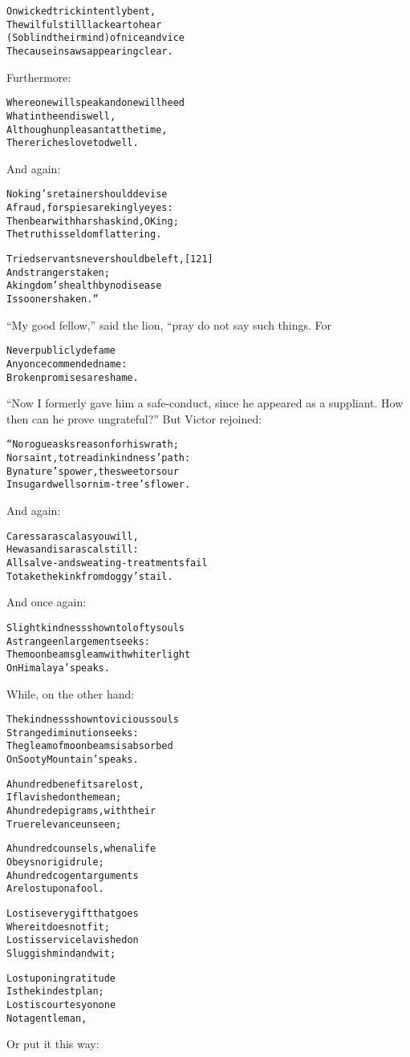 \documentclass{article}
\renewenvironment{verbatim}{\begin{alltt}\normalfont\begin{centering}}{\end{centering}\end{alltt}}
\begin{document}
\begin{verbatim}
On wicked trick intently bent,
    The wilful still lack ear to hear
(So blind their mind) of nice and vice
    The cause in saws appearing clear.
\end{verbatim}
Furthermore:

\begin{verbatim}
Where one will speak and one will heed
    What in the end is well,
Although unpleasant at the time,
    There riches love to dwell.
\end{verbatim}
And again:

\begin{verbatim}
No king's retainer should devise
A fraud, for spies are kingly eyes:
Then bear with harsh as kind, O King;
The truth is seldom flattering.

Tried servants never should be left,                    [121]
    And strangers taken;
A kingdom's health by no disease
    Is sooner shaken.”
\end{verbatim}
``My good fellow,'' said the lion, “pray do not say such things.
For

\begin{verbatim}
Never publicly defame
Any once commended name:
Broken promises are shame.
\end{verbatim}
``Now I formerly gave him a safe-conduct, since he appeared as a suppliant. How then can he prove ungrateful?''
But Victor rejoined:

\begin{verbatim}
“No rogue asks reason for his wrath;
Nor saint, to tread in kindness' path:
By nature's power, the sweet or sour
In sugar dwells or nim-tree's flower.
\end{verbatim}
And again:

\begin{verbatim}
Caress a rascal as you will,
He was and is a rascal still:
All salve- and sweating-treatments fail
To take the kink from doggy's tail.
\end{verbatim}
And once again:

\begin{verbatim}
Slight kindness shown to lofty souls
A strange enlargement seeks:
The moonbeams gleam with whiter light
On Himalaya's peaks.
\end{verbatim}
While, on the other hand:

\begin{verbatim}
The kindness shown to vicious souls
    Strange diminution seeks:
The gleam of moonbeams is absorbed
    On Sooty Mountain's peaks.

A hundred benefits are lost,
    If lavished on the mean;
A hundred epigrams, with their
    True relevance unseen;

A hundred counsels, when a life
    Obeys no rigid rule;
A hundred cogent arguments
    Are lost upon a fool.

Lost is every gift that goes
    Where it does not fit;
Lost is service lavished on
    Sluggish mind and wit;

Lost upon ingratitude
    Is the kindest plan;
Lost is courtesy on one
    Not a gentleman,
\end{verbatim}
Or put it this way:
\end{document}
